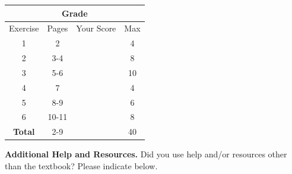 \documentclass[letterpaper,11pt,twoside]{article}
\begin{document}
\begin{multicols}{2}


\begin{tabular}{|c|c|c|c|}
\multicolumn{4}{c}{\textbf{Grade}} \\\hline
Exercise & Pages & Your Score & Max \\\hline
\multirow{2}{*}{1} & \multirow{2}{*}{2} & \multirow{2}{*}{\phantom{100100}} & \multirow{2}{*}{4} \\
& & & \\\hline
\multirow{2}{*}{2} & \multirow{2}{*}{3-4} & \multirow{2}{*}{\phantom{100100}} & \multirow{2}{*}{8} \\
& & & \\\hline
\multirow{2}{*}{3} & \multirow{2}{*}{5-6} & \multirow{2}{*}{\phantom{100100}} & \multirow{2}{*}{10} \\
& & & \\\hline
\multirow{2}{*}{4} & \multirow{2}{*}{7} & \multirow{2}{*}{\phantom{100100}} & \multirow{2}{*}{4} \\
& & & \\\hline
\multirow{2}{*}{5} & \multirow{2}{*}{8-9} & \multirow{2}{*}{\phantom{100100}} & \multirow{2}{*}{6} \\
& & & \\\hline
\multirow{2}{*}{6} & \multirow{2}{*}{10-11} & \multirow{2}{*}{\phantom{100100}} & \multirow{2}{*}{8} \\
& & & \\\hline
\multirow{2}{*}{\textbf{Total}} & \multirow{2}{*}{2-9} & \multirow{2}{*}{\phantom{100100}} & \multirow{2}{*}{40} \\
& & & \\\hline
\end{tabular}


\noindent\textbf{Additional Help and Resources.}
Did you use help and/or resources other than the textbook? Please indicate below.

\vspace{\fill}
\noindent\phantom{Dimitris}

\end{multicols}



\end{document}
